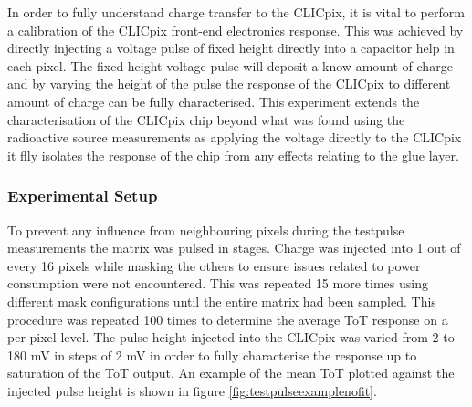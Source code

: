 In order to fully understand charge transfer to the CLICpix, it is vital to perform a calibration of the CLICpix front-end electronics response.  This was achieved by directly injecting a voltage pulse of fixed height directly into a capacitor help in each pixel.  The fixed height voltage pulse will deposit a know amount of charge and by varying the height of the pulse the response of the CLICpix to different amount of charge can be fully characterised.  This experiment extends the characterisation of the CLICpix chip beyond what was found using the radioactive source measurements as applying the voltage directly to the CLICpix it flly isolates the response of the chip from any effects relating to the glue layer.  


\subsubsection{Experimental Setup}

To prevent any influence from neighbouring pixels during the testpulse measurements the matrix was pulsed in stages.  Charge was injected into 1 out of every 16 pixels while masking the others to ensure issues related to power consumption were not encountered.  This was repeated 15 more times using different mask configurations until the entire matrix had been sampled.  This procedure was repeated 100 times to determine the average ToT response on a per-pixel level.  The pulse height injected into the CLICpix was varied from 2 to 180 mV in steps of 2 mV in order to fully characterise the response up to saturation of the ToT output.  An example of the mean ToT plotted against the injected pulse height is shown in figure \ref{fig:testpulseexamplenofit}.  

